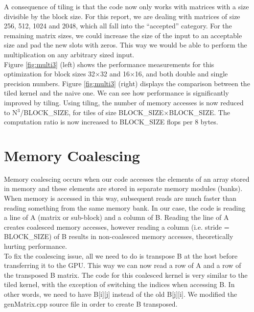 \documentclass[paper=a4, fontsize=11pt]{scrartcl} %
\numberwithin{equation}{section} %
\numberwithin{figure}{section} %
\numberwithin{table}{section} %
\begin{document}
A consequence of tiling is that the code now only works with matrices with a size divisible by the block size. For this report, we are dealing with matrices of size 256, 512, 1024 and 2048, which all fall into the ``accepted'' category. For the remaining matrix sizes, we could increase the size of the input to an acceptable size and pad the new slots with zeros. This way we would be able to perform the multiplication on any arbitrary sized input.\\

Figure \ref{fig:multi3} (left) shows the performance measurements for this optimization for block sizes 32$\times$32 and 16$\times$16, and both double and single precision numbers. Figure \ref{fig:multi3} (right) displays the comparison between the tiled kernel and the naive one. We can see how performance is significantly improved by tiling. Using tiling, the number of memory accesses is now reduced to N$^3$/BLOCK\_SIZE, for tiles of size BLOCK\_SIZE$\times$BLOCK\_SIZE. The computation ratio is now increased to BLOCK\_SIZE flops per 8 bytes.

\section{\textbf{Memory Coalescing}}

Memory coalescing occurs when our code accesses the elements of an array stored in memory and these elements are stored in separate memory modules (banks). When memory is accessed in this way, subsequent reads are much faster than reading something from the same memory bank. In our case, the code is reading a line of A (matrix or sub-block) and a column of B. Reading the line of A creates coalesced memory accesses, however reading a column (i.e. stride = BLOCK\_SIZE) of B results in non-coalesced memory accesses, theoretically hurting performance.\\

To fix the coalescing issue, all we need to do is transpose B at the host before transferring it to the GPU. This way we can now read a row of A and a row of the transposed B matrix. The code for this coalesced kernel is very similar to the tiled kernel, with the exception of switching the indices when accessing B. In other words, we need to have B[i][j] instead of the old B[j][i]. We modified the genMatrix.cpp source file in order to create B transposed.\\
\end{document}
